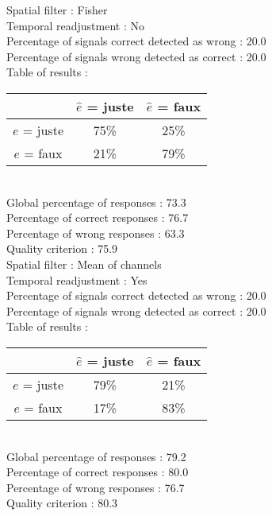 Spatial filter : Fisher \\
Temporal readjustment : No \\
Percentage of signals correct detected as wrong :   20.0 \\
Percentage of signals wrong detected as correct :   20.0 \\
Table of results : \\
\begin{tabular}{|c|c|c|}
\hline				& $\hat{e}$ = juste & $\hat{e}$ = faux \\
\hline  $e$ = juste	&     75\%			&     25\%		\\
\hline  $e$ = faux	&     21\%			&     79\%		\\
\hline
\end{tabular}\\
Global percentage of responses :   73.3 \\
Percentage of correct responses :   76.7 \\
Percentage of wrong responses :   63.3 \\
Quality criterion :   75.9 \\

Spatial filter : Mean of channels \\
Temporal readjustment : Yes \\
Percentage of signals correct detected as wrong :   20.0 \\
Percentage of signals wrong detected as correct :   20.0 \\
Table of results : \\
\begin{tabular}{|c|c|c|}
\hline				& $\hat{e}$ = juste & $\hat{e}$ = faux \\
\hline  $e$ = juste	&     79\%			&     21\%		\\
\hline  $e$ = faux	&     17\%			&     83\%		\\
\hline
\end{tabular}\\
Global percentage of responses :   79.2 \\
Percentage of correct responses :   80.0 \\
Percentage of wrong responses :   76.7 \\
Quality criterion :   80.3 \\

